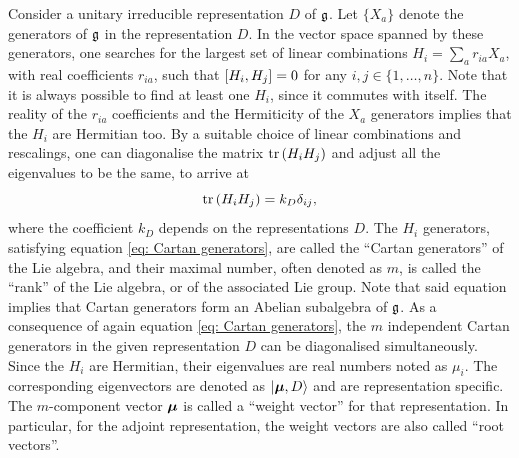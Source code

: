 Consider a unitary irreducible representation $D$ of $\mathfrak{g}$. Let $\{X_a\}$ denote the generators of $\mathfrak{g}$ in the representation $D$. In the vector space spanned by these generators, one searches for the largest set of linear combinations $H_i = \sum_ar_{ia}X_a$, with real coefficients $r_{ia}$, such that $[H_i,H_j] = 0$ for any $i,j \in \{1,\dots,n\}$. Note that it is always possible to find at least one $H_i$, since it commutes with itself. The reality of the $r_{ia}$ coefficients and the Hermiticity of the $X_a$ generators implies that the $H_i$ are Hermitian too. By a suitable choice of linear combinations and rescalings, one can diagonalise the matrix $\mathrm{tr}\,{(H_iH_j)}$ and adjust all the eigenvalues to be the same, to arrive at
\begin{equation}
\label{eq: Cartan generators}
    \mathrm{tr}\,{(H_iH_j)} = k_D\delta_{ij},
\end{equation}
where the coefficient $k_D$ depends on the representations $D$. The $H_i$ generators, satisfying equation \eqref{eq: Cartan generators}, are called the ``Cartan generators'' of the Lie algebra, and their maximal number, often denoted as $m$, is called the ``rank'' of the Lie algebra, or of the associated Lie group. Note that said equation implies that Cartan generators form an Abelian subalgebra of $\mathfrak{g}$. As a consequence of again equation \eqref{eq: Cartan generators}, the $m$ independent Cartan generators in the given representation $D$ can be diagonalised simultaneously. Since the $H_i$ are Hermitian, their eigenvalues are real numbers noted as $\mu_i$. The corresponding eigenvectors are denoted as $\ket{\bm{\mu},D}$ and are representation specific. The $m$-component vector $\bm{\mu}$ is called a ``weight vector'' for that representation. In particular, for the adjoint representation, the weight vectors are also called ``root vectors''. 

